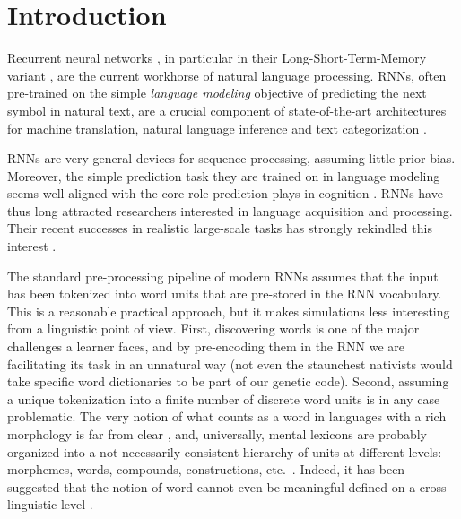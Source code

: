 \section{Introduction}
\label{sec:introduction}


Recurrent neural networks \cite[RNNs,][]{Elman:1990}, in particular
in their Long-Short-Term-Memory variant
\cite[LSTMs,][]{Hochreiter:Schmidhuber:1997}, are the current
workhorse of natural language processing. RNNs, often
pre-trained on the simple \emph{language modeling} objective of
predicting the next symbol in natural text, are a crucial
component of state-of-the-art architectures for machine
translation, natural language inference and text categorization
\cite{Goldberg:2017}.

RNNs are very general devices for sequence processing, assuming little
prior bias. Moreover, the simple prediction task they are trained on
in language modeling seems well-aligned with the core role prediction
plays in cognition \cite[e.g.,][]{Bar:2007,Clark:2016}. RNNs have thus
long attracted researchers
interested in language acquisition and processing. Their recent successes in
realistic large-scale tasks has strongly rekindled this interest
\cite[see, e.g.,][and references there]{Frank:etal:2013,Lau:etal:2017,Kirov:Cotterell:2018,McCoy:etal:2018,Pater:2018}.

The standard pre-processing pipeline of modern RNNs assumes that the
input has been tokenized into word units that are pre-stored in the
RNN vocabulary. This is a reasonable practical approach, but it makes
simulations less interesting from a linguistic point of view. First,
discovering words is one of the major challenges a learner faces, and
by pre-encoding them in the RNN we are facilitating its task in an
unnatural way (not even the staunchest nativists would take specific
word dictionaries to be part of our genetic code). Second, assuming a
unique tokenization into a finite number of discrete word units is in
any case problematic. The very notion of what counts as a word in
languages with a rich morphology is far from clear
\cite[e.g.,][]{Bickel:Zuniga:2017}, and, universally, mental lexicons
are probably organized into a not-necessarily-consistent hierarchy of
units at different levels: morphemes, words, compounds, constructions,
etc.~\cite[e.g.,][]{Goldberg:2005}. Indeed, it has been suggested that
the notion of word cannot even be meaningful defined on a
cross-linguistic level \cite{Haspelmath:2011}.

